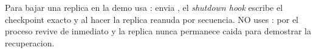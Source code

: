 \begin{advertencia}
Para bajar una replica en la demo usa : 
envia , el \emph{shutdown hook} escribe el checkpoint exacto y al
hacer  la replica reanuda por secuencia. NO uses
: por  el proceso revive de inmediato y la
replica nunca permanece caida para demostrar la recuperacion.
\end{advertencia}
